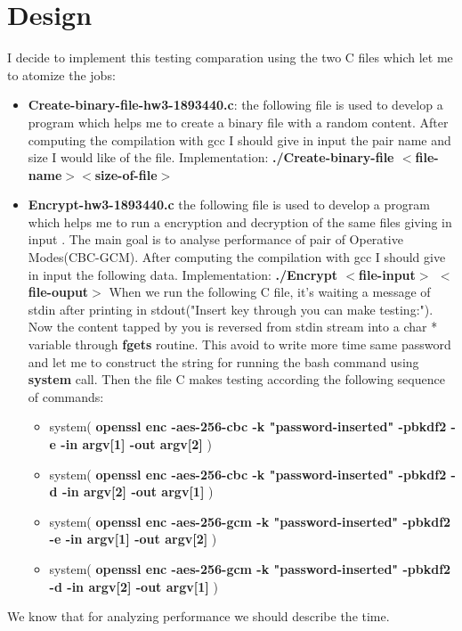 \documentclass[11pt,a4paper]{article}
\begin{document}
\section{Design}
I decide to implement this testing comparation using the two C files which let me to atomize the jobs:
\begin{itemize}
    
    
    
    \item\textbf{Create-binary-file-hw3-1893440.c}: the following file is used to develop a program which helps me to create a binary file with a random content. After computing the compilation with gcc I should give in input the pair name and size I would like of the file.       \newline
Implementation:\newline
\textbf{./Create-binary-file $<$file-name$> <$size-of-file$>$}
    \item\textbf{Encrypt-hw3-1893440.c}
     the following file is used to develop a program which helps me to run a encryption and decryption of the same files giving in input . The main goal is to analyse performance of pair of Operative Modes(CBC-GCM). After computing the compilation with gcc I should give in input the following data.       \newline\newline
Implementation:\newline
\textbf{./Encrypt $<$file-input$>$ $<$file-ouput$>$ 
}\newline
When we run the following C file, it's waiting a message of stdin after printing in stdout\newline ("Insert key through you can make testing:").\newline
Now the content tapped by you is reversed from stdin stream into a char * variable through \textbf{fgets} routine. This avoid to write more time same password and let me to construct the string for running the bash command using \textbf{system} call.
Then the file C makes testing according the following sequence of commands:
\begin{itemize}
    \item system( \textbf{openssl enc -aes-256-cbc -k "password-inserted" -pbkdf2 -e -in argv[1] -out argv[2] })
    
    \item system( \textbf{openssl enc -aes-256-cbc -k "password-inserted" -pbkdf2 -d -in argv[2] -out argv[1] })
    
    
    \item system( \textbf{openssl enc -aes-256-gcm -k "password-inserted" -pbkdf2 -e -in argv[1] -out argv[2] })
    
    
    \item system( \textbf{openssl enc -aes-256-gcm -k "password-inserted" -pbkdf2 -d -in argv[2] -out argv[1] })
\end{itemize}

\end{itemize}
We know that for analyzing performance we should describe the time.
\end{document}
